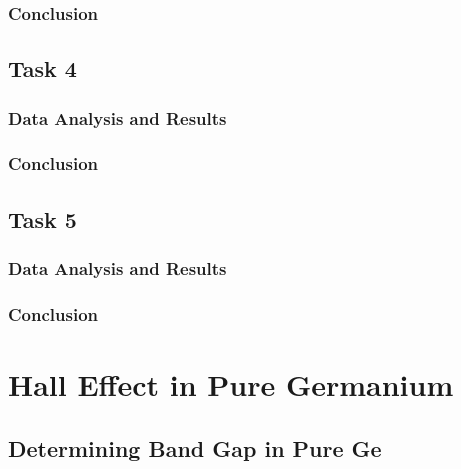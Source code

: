\documentclass[a4paper]{article}
\begin{document}
\subsubsection{Conclusion}

\subsection{Task 4}

\subsubsection{Data Analysis and Results}

\subsubsection{Conclusion}

\subsection{Task 5}

\subsubsection{Data Analysis and Results}

\subsubsection{Conclusion}

\newpage

\section{Hall Effect in Pure Germanium}

\subsection{Determining Band Gap in Pure Ge}
\end{document}
